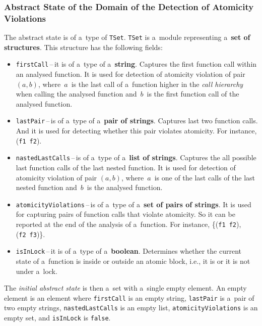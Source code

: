 \subsubsection{%
    Abstract State of the Domain of the Detection of Atomicity Violations
}

The abstract state is of a~type of \texttt{TSet}. \texttt{TSet} is a~module
representing a~\textbf{set of structures}. This structure has the following
fields:
\begin{itemize}
    \item
        \texttt{firstCall}\,--\,it is of a~type of a~\textbf{string}. Captures
        the first function call within an analysed function. It is used
        for detection of atomicity violation of pair $ (a, b) $,
        where~$ a $~is the last call of a~function higher in the \emph{call
        hierarchy} when calling the analysed function and~$ b $~is the first
        function call of the analysed function.

    \item
        \texttt{lastPair}\,--\,is of a~type of a~\textbf{pair of strings}.
        Captures last two function calls. And it is used for detecting
        whether this pair violates atomicity. For instance,
        (\texttt{f1}~\texttt{f2}).

    \item
        \texttt{nastedLastCalls}\,--\,is of a~type of a~\textbf{list of
        strings}. Captures the all possible last function calls of the
        last nested function. It is used for detection of atomicity violation
        of pair $ (a, b) $, where~$ a $~is one of the last calls of the
        last nested function and~$ b $~is the analysed function.

    \item
        \texttt{atomicityViolations}\,--\,is of a~type of a~\textbf{set
        of pairs of strings}. It is used for capturing pairs of function calls
        that violate atomicity. So it can be reported at the end of the
        analysis of a~function. For instance, \{(\texttt{f1}~\texttt{f2}),
        (\texttt{f2}~\texttt{f3})\}.

    \item
        \texttt{isInLock}\,--\,it is of a~type of a~\textbf{boolean}. Determines
        whether the current state of a~function is inside or outside an
        atomic block, i.e., it is or it is not under a~lock.
\end{itemize}
The \emph{initial abstract state} is then a~set with a~single empty element.
An empty element is an element where \texttt{firstCall} is an empty
string, \texttt{lastPair} is a~pair of two empty strings,
\texttt{nastedLastCalls} is an empty list, \texttt{atomicityViolations} is
an empty set, and \texttt{isInLock} is \texttt{false}.

